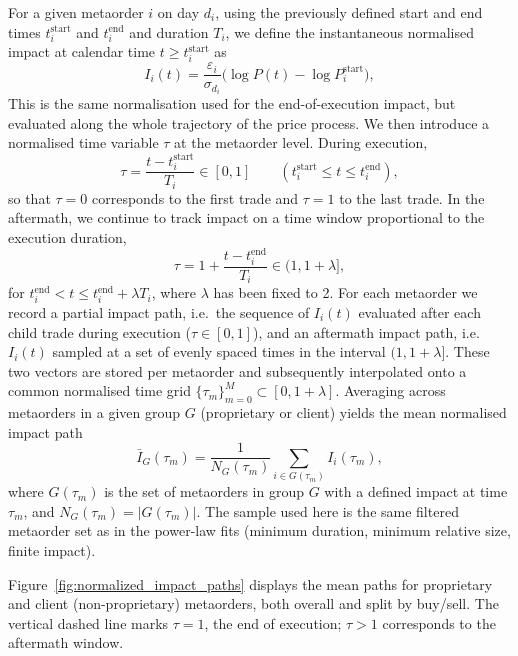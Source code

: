 \documentclass[11pt]{article}
\begin{document}
For a given metaorder $i$ on day $d_i$, using the previously defined start and
end times $t_i^{\text{start}}$ and $t_i^{\text{end}}$ and duration $T_i$, we define the
instantaneous normalised impact at calendar time $t \ge t_i^{\text{start}}$ as
\begin{equation}
  I_i(t) = \frac{\varepsilon_i}{\sigma_{d_i}}\bigl(\log P(t) - \log P_i^{\text{start}}\bigr),
\end{equation}
This is the same normalisation used for
the end-of-execution impact, but evaluated along the whole trajectory of the price process. We then introduce a 
normalised time variable $\tau$ at the metaorder level. During execution,
\begin{equation}
  \tau = \frac{t - t_i^{\text{start}}}{T_i} \in [0,1] \qquad
  (t_i^{\text{start}} \le t \le t_i^{\text{end}}),
\end{equation}
so that $\tau = 0$ corresponds to the first trade and $\tau = 1$ to the last trade. In the
aftermath, we continue to track impact on a time window proportional to the execution duration,
\begin{equation}
  \tau = 1 + \frac{t - t_i^{\text{end}}}{T_i} \in (1, 1 + \lambda],
\end{equation}
for $t_i^{\text{end}} < t \le t_i^{\text{end}} + \lambda T_i$, where $\lambda$ has been fixed to 2. For each metaorder 
we record a partial impact path, i.e.\ the sequence of $I_i(t)$ evaluated after each child
trade during execution ($\tau \in [0,1]$), and an aftermath impact path, i.e.\ $I_i(t)$ sampled at a set of 
evenly spaced times in the interval $(1,1+\lambda]$.
These two vectors are stored per metaorder and subsequently interpolated onto a common normalised time grid 
$\{\tau_m\}_{m=0}^M \subset [0,1+\lambda]$. Averaging across metaorders in a given group $G$ (proprietary or client) 
yields the mean normalised impact path
\begin{equation}
  \bar I_G(\tau_m) = \frac{1}{N_G(\tau_m)} \sum_{i \in G(\tau_m)} I_i(\tau_m),
\end{equation}
where $G(\tau_m)$ is the set of metaorders in group $G$ with a defined impact at time $\tau_m$,
and $N_G(\tau_m) = |G(\tau_m)|$. The sample used here is the same filtered metaorder set as in the
power-law fits (minimum duration, minimum relative size, finite impact).

Figure~\ref{fig:normalized_impact_paths} displays the mean paths for proprietary and client (non-proprietary) metaorders, 
both overall and split by buy/sell. The vertical dashed line marks $\tau = 1$, the end of execution; $\tau > 1$ corresponds 
to the aftermath window.
\end{document}

